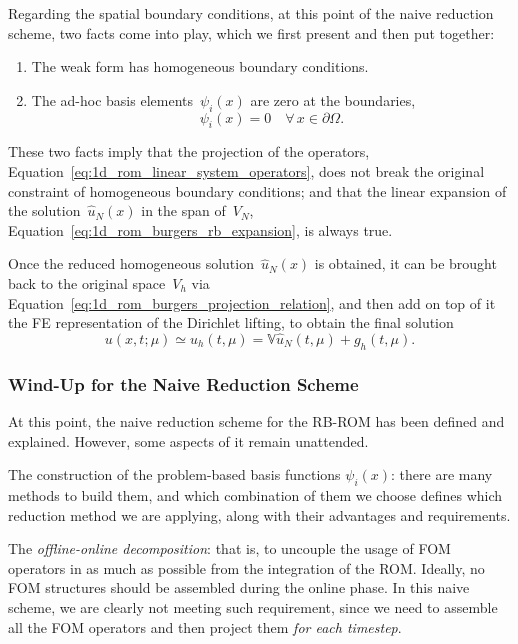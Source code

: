 \documentclass[../../thesis.tex]{subfiles}
\newcommand{\rbV}{\ensuremath{\mathbb{V}}}
\begin{document}
Regarding the spatial boundary conditions, at this point of the naive reduction scheme, two facts come into play, which we first present and then put together:
\begin{enumerate}
    \item The weak form has homogeneous boundary conditions.
    \item The ad-hoc basis elements~$\psi_i(x)$ are zero at the boundaries,
    \begin{equation*}
        \psi_i(x) = 0 \quad \forall \, x \in \partial \Omega.
    \end{equation*}
\end{enumerate}
These two facts imply that the projection of the operators, 
Equation~\eqref{eq:1d_rom_linear_system_operators}, 
does not break the original constraint of homogeneous boundary conditions;
and that the linear expansion of the solution~$\hat{u}_N(x)$ in the span of~$V_N$, 
Equation~\eqref{eq:1d_rom_burgers_rb_expansion}, 
is always true.

Once the reduced homogeneous solution~$\hat{u}_N(x)$ is obtained, 
it can be brought back to the original space~$V_h$ via 
Equation~\eqref{eq:1d_rom_burgers_projection_relation}, 
and then add on top of it the FE representation of the Dirichlet lifting, to obtain the final solution
\begin{equation}
    u(x, t; \mu) \simeq u_h(t, \mu) = \rbV \hat{u}_N(t, \mu) + g_h(t,\mu).
\end{equation}

\subsubsection{Wind-Up for the Naive Reduction Scheme}
At this point, the naive reduction scheme for the RB-ROM has been defined and explained.
However, some aspects of it remain unattended.

The construction of the problem-based basis functions $\psi_i(x)$:
there are many methods to build them, and which combination of them we choose 
defines which reduction method we are applying, along with their advantages and requirements.

The \emph{offline-online decomposition}: 
that is, to uncouple the usage of FOM operators in as much as possible from the integration of the ROM. 
Ideally, no FOM structures should be assembled during the online phase.
In this naive scheme, we are clearly not meeting such requirement, since we need to assemble all the FOM operators and then project them \emph{for each timestep}.
\end{document}
